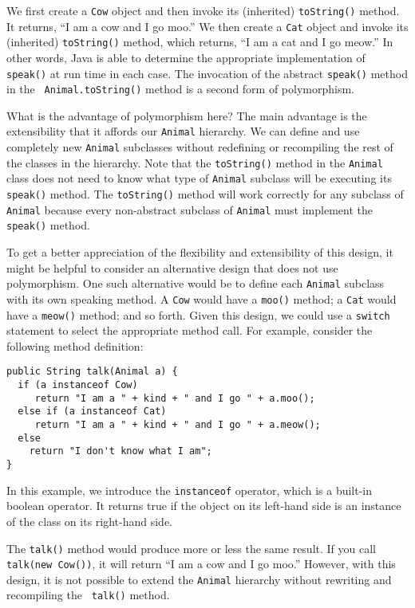 \noindent We first create a {\tt Cow} object and then invoke its
(inherited) {\tt toString()} method. It returns, ``I am a cow and I go
moo.''  We then create a {\tt Cat} object and invoke its (inherited)
{\tt toString()} method, which returns, ``I am a cat and I go meow.''
In other words, Java is able to determine the appropriate
implementation of {\tt speak()} at run time in each case. The
invocation of the abstract {\tt speak()} method in the {\tt
Animal.toString()} method is a second form of polymorphism.

What is the advantage of polymorphism here? The main advantage is the
extensibility that it affords our {\tt Animal} hierarchy.  We can
define and use completely new {\tt Animal} subclasses without
redefining or recompiling the rest of the classes in the hierarchy.
Note that the {\tt toString()} method in the {\tt Animal} class does
not need to know what type of {\tt Animal} subclass will be executing
its {\tt speak()} method. The {\tt toString()} method will work
correctly for any subclass of {\tt Animal} because every non-abstract
subclass of {\tt Animal} must implement the {\tt speak()} method.

To get a better appreciation of the flexibility and extensibility of
this design, it might be helpful to consider an alternative design that
does not use polymorphism. One such alternative would be to define each
{\tt Animal} subclass with its own speaking method. A {\tt Cow} would
have a {\tt moo()} method; a {\tt Cat} would have a {\tt meow()} method;
and so forth.  Given this design, we could use a {\tt switch}
statement to select the appropriate method call. For example, consider
the following method definition:

\begin{jjjlisting}
\begin{lstlisting}
public String talk(Animal a) {
  if (a instanceof Cow)
     return "I am a " + kind + " and I go " + a.moo();
  else if (a instanceof Cat)
     return "I am a " + kind + " and I go " + a.meow();
  else
    return "I don't know what I am";
}
\end{lstlisting}
\end{jjjlisting}

\noindent In this example, we introduce the {\tt instanceof} operator,
which is a built-in boolean operator. It returns true if the object on
its left-hand side is an instance of the class on its right-hand side.

The {\tt talk()} method would produce more or less the same result. If
you call {\tt talk(new Cow())}, it will return ``I am a cow and I go
moo.''  However, with this design, it is not possible to extend the
{\tt Animal} hierarchy without rewriting and recompiling the {\tt
talk()} method.

